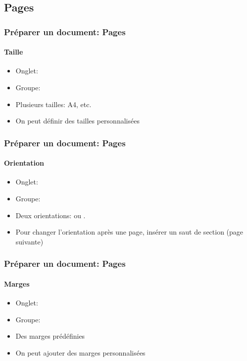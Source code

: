 \documentclass[xcolor=table]{beamer}
\begin{document}
\subsection{Pages}

\begin{frame}[t]
\frametitle{Préparer un document: Pages}
\framesubtitle{Taille}


\begin{minipage}{0.44\textwidth}
	\begin{itemize}
		\item Onglet: 
		\item Groupe: 
		\item Plusieurs tailles: A4, etc.
		\item On peut définir des tailles personnalisées
	\end{itemize}
\end{minipage}
\begin{minipage}{0.55\textwidth}
\end{minipage}

\end{frame}


\begin{frame}[t]
\frametitle{Préparer un document: Pages}
\framesubtitle{Orientation}

\begin{minipage}{0.44\textwidth}
	\begin{itemize}
		\item Onglet: 
		\item Groupe: 
		\item Deux orientations:  ou .
		\item Pour changer l'orientation après une page, insérer un saut de section (page suivante)
	\end{itemize}
\end{minipage}
\begin{minipage}{0.55\textwidth}
\end{minipage}

\end{frame}

\begin{frame}[t]
\frametitle{Préparer un document: Pages}
\framesubtitle{Marges}

\begin{minipage}{0.44\textwidth}
	\begin{itemize}
		\item Onglet: 
		\item Groupe: 
		\item Des marges prédéfinies
		\item On peut ajouter des marges personnalisées
	\end{itemize}
\end{minipage}
\begin{minipage}{0.55\textwidth}
\end{minipage}

\end{frame}
\end{document}
